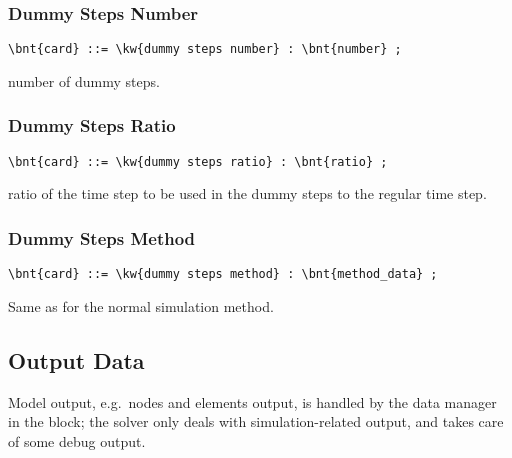 \subsubsection{Dummy Steps Number}
\begin{Verbatim}[commandchars=\\\{\}]
    \bnt{card} ::= \kw{dummy steps number} : \bnt{number} ;
\end{Verbatim}
number of dummy steps.

\subsubsection{Dummy Steps Ratio}
\begin{Verbatim}[commandchars=\\\{\}]
    \bnt{card} ::= \kw{dummy steps ratio} : \bnt{ratio} ;
\end{Verbatim}
ratio of the time step to be used in the dummy steps to the regular
time step.

\subsubsection{Dummy Steps Method}
\begin{Verbatim}[commandchars=\\\{\}]
    \bnt{card} ::= \kw{dummy steps method} : \bnt{method_data} ;
\end{Verbatim}
Same as for the normal simulation method. 

\subsection{Output Data}\label{sec:PROBLEMS:OUTPUT}
Model output, e.g.\ nodes and elements output, is handled
by the data manager in the  block;
the solver only deals with simulation-related output,
and takes care of some debug output.


